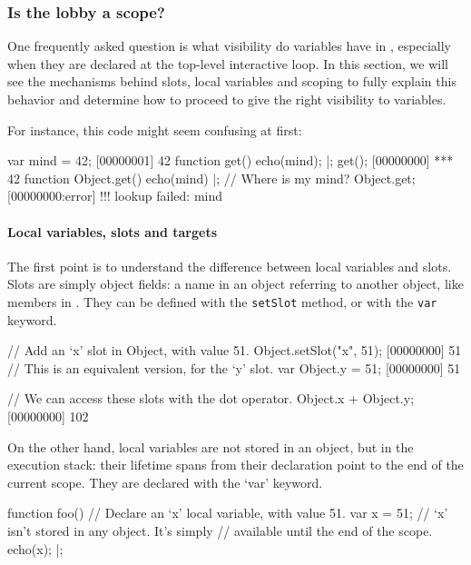 \subsubsection{Is the lobby a scope?}

One frequently asked question is what visibility do variables have in
\us, especially when they are declared at the top-level interactive
loop.  In this section, we will see the mechanisms behind slots, local
variables and scoping to fully explain this behavior and determine how
to proceed to give the right visibility to variables.

For instance, this code might seem confusing at first:

\begin{urbiscript}
var mind = 42;
[00000001] 42
function get()
{
  echo(mind);
}|;
get();
[00000000] *** 42
function Object.get()
{
  echo(mind)
}|;
// Where is my mind?
Object.get;
[00000000:error] !!! lookup failed: mind
\end{urbiscript}

\paragraph{Local variables, slots and targets}
The first point is to understand the difference between local
variables and slots. Slots are simply object fields: a name in an
object referring to another object, like members in \Cxx. They can be
defined with the \lstinline|setSlot| method, or with the
\lstinline|var| keyword.

\begin{urbiscript}
// Add an `x' slot in Object, with value 51.
Object.setSlot("x", 51);
[00000000] 51
// This is an equivalent version, for the `y' slot.
var Object.y = 51;
[00000000] 51

// We can access these slots with the dot operator.
Object.x + Object.y;
[00000000] 102
\end{urbiscript}

On the other hand, local variables are not stored in an object, but in
the execution stack: their lifetime spans from their declaration point
to the end of the current scope. They are declared with the `var'
keyword.

\begin{urbiscript}
function foo()
{
  // Declare an `x' local variable, with value 51.
  var x = 51;
  // `x' isn't stored in any object. It's simply
  // available until the end of the scope.
  echo(x);
}|;
\end{urbiscript}

